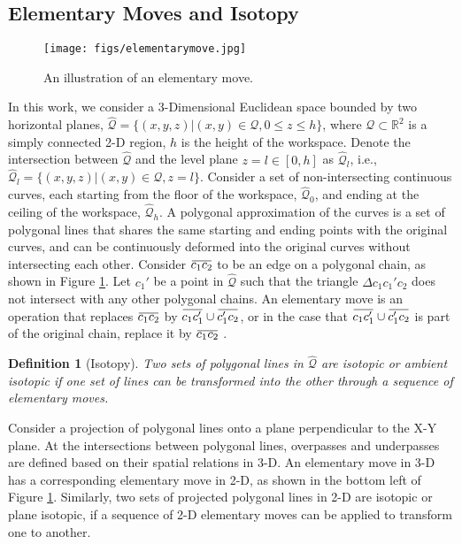 \documentclass[conference]{IEEEtran}
\newtheorem{defn}[thm]{Definition}
\newcommand*{\myset}[1]{\mathcal{#1}} %
\newcommand*{\workspace}{\myset{Q}} %
\newcommand*{\rtwo}{\mathbb{R}^2}
\newcommand*{\height}{h}
\newcommand*{\aug}[1]{\hat{#1}} %
\newcommand*{\triang}{\Delta} %
\newcommand{\overbar}[1]{\mkern 1.5mu\overline{\mkern-1.5mu#1\mkern-1.5mu}\mkern 1.5mu}
\newcommand*{\dummyc}{c}
\newcommand*{\dummyl}{l}
\begin{document}
\subsection{Elementary Moves and Isotopy}\label{subsec: elementary}
\begin{figure}[!t]
\centering
\texttt{[image: figs/elementarymove.jpg]}
\caption{\footnotesize An illustration of an elementary move.}
\label{fig: elementary}
\end{figure}
In this work, we consider a 3-Dimensional Euclidean space bounded by two horizontal planes, $\aug{\workspace}=\{(x,y,z)|(x,y)\in\workspace,0\leq z\leq \height\}$, where $\workspace\subset\rtwo$ is a simply connected 2-D region, $\height$ is the height of the workspace.
Denote the intersection between $\aug{\workspace}$ and the level plane $z=\dummyl\in[0,h]$ as $\aug{\workspace}_{\dummyl}$, i.e.,
$\aug{\workspace}_{\dummyl}=\{(x,y,z)|(x,y)\in\workspace,z=\dummyl\}$.
Consider a set of non-intersecting continuous curves, each starting from the floor of the workspace, $\aug{\workspace}_0$, and ending at the ceiling of the workspace, $\aug{\workspace}_\height$.
A polygonal approximation of the curves is a set of polygonal lines that shares the same starting and ending points with the original curves, and can be continuously deformed into the original curves without intersecting each other.
Consider $\overbar{\dummyc_1\dummyc_2}$ to be an edge on a polygonal chain, as shown in Figure \ref{fig: elementary}. Let $\dummyc_1'$ be a point in $\aug{\workspace}$ such that the triangle $\triang\dummyc_1\dummyc_1'\dummyc_2$ does not intersect with any other polygonal chains. 
An elementary move is an operation that replaces $\overbar{\dummyc_1\dummyc_2}$ by $\overbar{\dummyc_1\dummyc_1'}\cup\overbar{\dummyc_1'\dummyc_2}$, or in the case that $\overbar{\dummyc_1\dummyc_1'}\cup\overbar{\dummyc_1'\dummyc_2}$ is part of the original chain, replace it by $\overbar{\dummyc_1\dummyc_2}$ \cite{prasolov1997knots}.
\begin{defn}[Isotopy]
    Two sets of polygonal lines in $\aug{\workspace}$ are isotopic or ambient isotopic if one set of lines can be transformed into the other through a sequence of elementary moves.
\end{defn}


Consider a projection of polygonal lines onto a plane perpendicular to the X-Y plane. 
At the intersections between polygonal lines, overpasses and underpasses are defined based on their spatial relations in 3-D.
An elementary move in 3-D has a corresponding elementary move in 2-D, as shown in the bottom left of Figure \ref{fig: elementary}.
Similarly, two sets of projected polygonal lines in 2-D are isotopic or plane isotopic, if a sequence of 2-D elementary moves can be applied to transform one to another.
\end{document}
